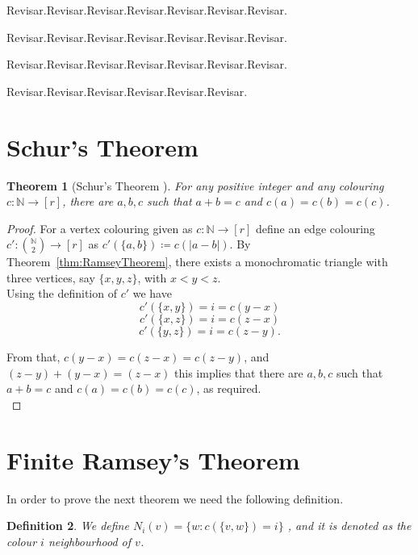 \documentclass[12pt,twoside,a4paper,bibliography=totocnumbered]{book}
\numberwithin{equation}{section}
\newtheorem{theorem}             {Theorem}[section]
\newtheorem{definition}	[theorem] {Definition}
\theoremstyle{remark}
\begin{document}
Revisar.Revisar.Revisar.Revisar.Revisar.Revisar.Revisar.

Revisar.Revisar.Revisar.Revisar.Revisar.Revisar.Revisar.

Revisar.Revisar.Revisar.Revisar.Revisar.Revisar.Revisar.

Revisar.Revisar.Revisar.Revisar.Revisar.Revisar.



\section{Schur's Theorem}

\begin{theorem}[{Schur's Theorem \cite{Sc16}}]\label{thm:Schur'sTheorem} %
For any positive integer and any colouring $c\colon \mathbb{N} \rightarrow [r]$, there are $a,b,c$ such that $a+b=c$ and $c(a) = c(b) = c(c)$.
\end{theorem}
\begin{proof}
  For a vertex colouring given as $c\colon \mathbb{N} \rightarrow [r]$ define an edge colouring $c'\colon \binom{\mathbb{N}}{2} \rightarrow [r]$ as $c'(\{a,b\}) \coloneqq c(|a-b|)$. By Theorem~\ref{thm:RamseyTheorem}, there exists a monochromatic triangle with three vertices, say $\{x,y,z\}$, with $x<y<z$.\\
Using the definition of $c'$  we have
$$c'(\{x,y\}) = i = c(y-x)$$
$$c'(\{x,z\})=  i = c(z-x)$$
$$c'(\{y,z\}) = i = c(z-y).$$

From that, $c(y-x) = c(z-x) = c(z-y)$, and $(z-y)+(y-x)=(z-x)$ this implies that there are $a,b,c$ such that $a+b=c$ and $c(a) = c(b) = c(c)$, as required.\\
\end{proof}

\section{Finite Ramsey's Theorem}
In order to prove the next theorem we need the following definition.
\begin{definition}
We define $N_i(v) =\{ w: c(\{v,w\})=i\}$ , and it is denoted as the colour $i$ neighbourhood of $v$.
\end{definition}
\end{document}
